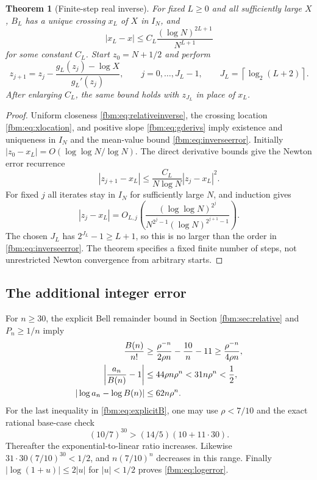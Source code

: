 \documentclass[11pt]{article}
\newtheorem{theorem}{Theorem}[section]
\theoremstyle{remark}\newtheorem{remark}[theorem]{Remark}
\newcommand{\ceil}[1]{\left\lceil #1\right\rceil}
\newcommand{\abs}[1]{\left|#1\right|}
\begin{document}
\begin{theorem}[Finite-step real inverse]\label{fbm:thm:inverse}
For fixed $L\geq0$ and all sufficiently large $X$, $B_L$ has a unique crossing $x_L$ of $X$ in $I_N$, and
\begin{equation}\label{fbm:eq:inverseerror}
 |x_L-x|\leq C_L\frac{(\log N)^{2L+1}}{N^{L+1}}
\end{equation}
for some constant $C_L$. Start $z_0=N+1/2$ and perform
\begin{equation}\label{fbm:eq:Newton}
 z_{j+1}=z_j-\frac{g_L(z_j)-\log X}{g_L'(z_j)},\qquad
 j=0,\ldots,J_L-1,\qquad J_L=\ceil{\log_2(L+2)}.
\end{equation}
After enlarging $C_L$, the same bound holds with $z_{J_L}$ in place of $x_L$.
\end{theorem}

\begin{proof}
Uniform closeness \eqref{fbm:eq:relativeinverse}, the crossing location \eqref{fbm:eq:xlocation}, and positive slope \eqref{fbm:eq:gderivs} imply existence and uniqueness in $I_N$ and the mean-value bound \eqref{fbm:eq:inverseerror}. Initially $|z_0-x_L|=O(\log\log N/\log N)$. The direct derivative bounds give the Newton error recurrence
\[
 |z_{j+1}-x_L|\leq\frac{C_L}{N\log N}|z_j-x_L|^2.
\]
For fixed $j$ all iterates stay in $I_N$ for sufficiently large $N$, and induction gives
\begin{equation}\label{fbm:eq:Newtonerror}
 |z_j-x_L|=O_{L,j}\!\left(
 \frac{(\log\log N)^{2^j}}
 {N^{2^j-1}(\log N)^{2^{j+1}-1}}\right).
\end{equation}
The chosen $J_L$ has $2^{J_L}-1\geq L+1$, so this is no larger than the order in \eqref{fbm:eq:inverseerror}. The theorem specifies a fixed finite number of steps, not unrestricted Newton convergence from arbitrary starts.
\end{proof}

\subsection{The additional integer error}
For $n\geq30$, the explicit Bell remainder bound in Section \ref{fbm:sec:relative} and $P_n\geq1/n$ imply
\begin{align}
 \frac{B(n)}{n!}&\geq\frac{\rho^{-n}}{2\rho n}-\frac{10}{n}-11
 \geq\frac{\rho^{-n}}{4\rho n},\label{fbm:eq:explicitB}\\
 \abs{\frac{a_n}{B(n)}-1}&\leq44\rho n\rho^n<31n\rho^n<\frac12,\notag\\
 |\log a_n-\log B(n)|&\leq62n\rho^n.\label{fbm:eq:logerror}
\end{align}
For the last inequality in \eqref{fbm:eq:explicitB}, one may use $\rho<7/10$ and the exact rational base-case check
\[
 (10/7)^{30}>(14/5)(10+11\cdot30).
\]
Thereafter the exponential-to-linear ratio increases. Likewise $31\cdot30(7/10)^{30}<1/2$, and $n(7/10)^n$ decreases in this range. Finally $|\log(1+u)|\leq2|u|$ for $|u|<1/2$ proves \eqref{fbm:eq:logerror}.
\end{document}
